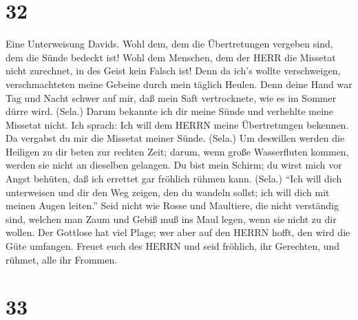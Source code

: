 \hypertarget{section-31}{%
\section{32}\label{section-31}}

 Eine Unterweisung Davids. Wohl dem, dem die Übertretungen
vergeben sind, dem die Sünde bedeckt ist!  Wohl dem
Menschen, dem der HERR die Missetat nicht zurechnet, in des Geist kein
Falsch ist!  Denn da ich's wollte verschweigen,
verschmachteten meine Gebeine durch mein täglich Heulen. 
Denn deine Hand war Tag und Nacht schwer auf mir, daß mein Saft
vertrocknete, wie es im Sommer dürre wird. (Sela.)  Darum
bekannte ich dir meine Sünde und verhehlte meine Missetat nicht. Ich
sprach: Ich will dem HERRN meine Übertretungen bekennen. Da vergabst du
mir die Missetat meiner Sünde. (Sela.)  Um deswillen werden
die Heiligen zu dir beten zur rechten Zeit; darum, wenn große
Wasserfluten kommen, werden sie nicht an dieselben gelangen.
 Du bist mein Schirm; du wirst mich vor Angst behüten, daß
ich errettet gar fröhlich rühmen kann. (Sela.)  ``Ich will
dich unterweisen und dir den Weg zeigen, den du wandeln sollst; ich will
dich mit meinen Augen leiten.''  Seid nicht wie Rosse und
Maultiere, die nicht verständig sind, welchen man Zaum und Gebiß muß ins
Maul legen, wenn sie nicht zu dir wollen.  Der Gottlose hat
viel Plage; wer aber auf den HERRN hofft, den wird die Güte umfangen.
 Freuet euch des HERRN und seid fröhlich, ihr Gerechten,
und rühmet, alle ihr Frommen.

\hypertarget{section-32}{%
\section{33}\label{section-32}}

